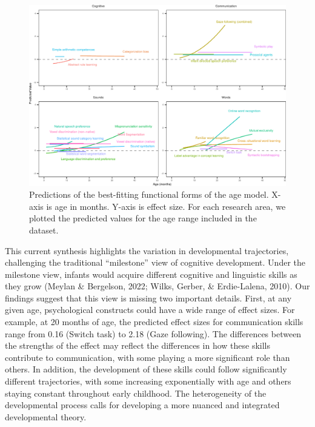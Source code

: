 \documentclass[10pt, letterpaper]{article}
\newenvironment{CodeChunk}{}{}
\begin{document}
\begin{CodeChunk}
\begin{figure}[h!]

{\centering \includegraphics{figs/2-col-imageb-1} 

}

\caption[Predictions of the best-fitting functional forms of the age model]{Predictions of the best-fitting functional forms of the age model. X-axis is age in months. Y-axis is effect size. For each research area, we plotted the predicted values for the age range included in the dataset.}\label{fig:2-col-imageb}
\end{figure}
\end{CodeChunk}

This current synthesis highlights the variation in developmental
trajectories, challenging the traditional ``milestone'' view of
cognitive development. Under the milestone view, infants would acquire
different cognitive and linguistic skills as they grow (Meylan \&
Bergelson, 2022; Wilks, Gerber, \& Erdie-Lalena, 2010). Our findings
suggest that this view is missing two important details. First, at any
given age, psychological constructs could have a wide range of effect
sizes. For example, at 20 months of age, the predicted effect sizes for
communication skills range from 0.16 (Switch task) to 2.18 (Gaze
following). The differences between the strengths of the effect may
reflect the differences in how these skills contribute to communication,
with some playing a more significant role than others. In addition, the
development of these skills could follow significantly different
trajectories, with some increasing exponentially with age and others
staying constant throughout early childhood. The heterogeneity of the
developmental process calls for developing a more nuanced and integrated
developmental theory.
\end{document}
